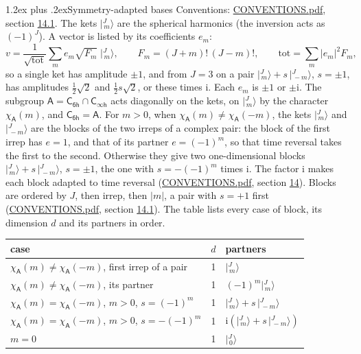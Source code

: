 \documentclass[10pt,a4paper]{article}
\makeatletter
\renewcommand\section{\@startsection{section}{1}{\z@}{-3ex plus -1ex minus -.2ex}%
  {1.2ex plus .2ex}{\normalfont\large\sffamily\bfseries\color{parttitle}}}
\numberwithin{equation}{section}
\newcommand{\grp}[1]{\mathsf{#1}}
\newcommand{\iunit}{\mathrm{i}}
\newcommand{\chiA}{\chi_{\grp{A}}}
\newcommand{\jm}[2]{\bigl\lvert{}^{#1}_{\,#2}\bigr\rangle}
\makeatother
\begin{document}
\section{Symmetry-adapted bases}\label{s:bases}
Conventions: \href{../../CONVENTIONS.pdf}{CONVENTIONS.pdf}, section \href{../../CONVENTIONS.pdf\#conv.14.1}{14.1}.
\leavevmode\label{n:index.m}\label{n:vector.ket}The kets $\jm{J}{m}$ are the spherical harmonics (the inversion acts as $(-1)^J$). \label{n:index.ketcoefficient}\label{n:vector.basis.symmetry}\label{n:index.ketweight}\label{n:index.total}A vector is listed by its coefficients $e_m$:
\begin{equation}\label{e:ket}v = \frac{1}{\sqrt{\mathrm{tot}}}\sum_m e_m\sqrt{F_m}\;\jm{J}{m},\qquad F_m = (J+m)!\,(J-m)!,\qquad \mathrm{tot} = \sum_m |e_m|^2F_m,\end{equation}
\leavevmode\label{n:index.pair.sign}so a single ket has amplitude $\pm1$, and from $J = 3$ on a pair $\jm{J}{m} + s\,\jm{J}{-m}$, $s = \pm1$, has amplitudes $\tfrac{1}{2}\sqrt{2}$ and $\tfrac{1}{2}s\sqrt{2}$, or these times $\iunit$. Each $e_m$ is $\pm1$ or $\pm\iunit$.
\leavevmode\label{n:group.A}\label{n:function.character.abelian}The subgroup $\grp{A} = \grp{C_{6h}}\cap\grp{C_{\infty h}}$ acts diagonally on the kets, on $\jm{J}{m}$ by the character $\chiA(m)$, and $\grp{C_{6h}} = \grp{A}$. For $m > 0$, when $\chiA(m) \ne \chiA(-m)$, the kets $\jm{J}{m}$ and $\jm{J}{-m}$ are the blocks of the two irreps of a complex pair: the block of the first irrep has $e = 1$, and that of its partner $e = (-1)^m$, so that time reversal takes the first to the second. Otherwise they give two one-dimensional blocks $\jm{J}{m} + s\,\jm{J}{-m}$, $s = \pm1$, the one with $s = -(-1)^m$ times $\iunit$. The factor $\iunit$ makes each block adapted to time reversal (\href{../../CONVENTIONS.pdf}{CONVENTIONS.pdf}, section \href{../../CONVENTIONS.pdf\#conv.14}{14}). Blocks are ordered by $J$, then irrep, then $|m|$, a pair with $s = +1$ first (\href{../../CONVENTIONS.pdf}{CONVENTIONS.pdf}, section \href{../../CONVENTIONS.pdf\#conv.14.1}{14.1}).
\leavevmode\label{n:head.case}\label{n:head.partners}The table lists every case of block, its dimension $d$ and its partners in order.
\begin{center}\begin{tabular}{@{}lrl@{}}\toprule
case & $d$ & partners\\\midrule
$\chiA(m) \ne \chiA(-m)$, first irrep of a pair & 1 & $\jm{J}{m}$\\
$\chiA(m) \ne \chiA(-m)$, its partner & 1 & $(-1)^m\jm{J}{m}$\\
$\chiA(m) = \chiA(-m)$, $m > 0$, $s = (-1)^m$ & 1 & $\jm{J}{m} + s\,\jm{J}{-m}$\\
$\chiA(m) = \chiA(-m)$, $m > 0$, $s = -(-1)^m$ & 1 & $\iunit(\jm{J}{m} + s\,\jm{J}{-m})$\\
$m = 0$ & 1 & $\jm{J}{0}$\\
\bottomrule\end{tabular}\end{center}
\end{document}
